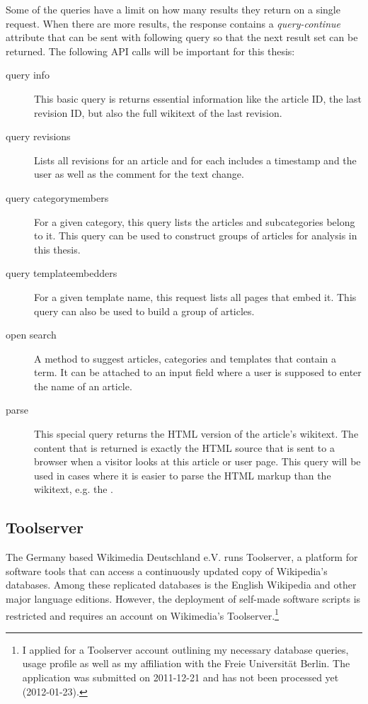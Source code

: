 Some of the queries have a limit on how many results they return on a single request.
When there are more results, the response contains a \emph{query-continue} attribute that can be sent with following query so that the next result set can be returned.
The following API calls will be important for this thesis:

\begin{description}
    \item[query info] This basic query is returns essential information like the article ID, the last revision ID, but also the full wikitext of the last revision.
    \item[query revisions] Lists all revisions for an article and for each includes a timestamp and the user as well as the comment for the text change.
    \item[query categorymembers] For a given category, this query lists the articles and subcategories belong to it.
    This query can be used to construct groups of articles for analysis in this thesis.
    \item[query templateembedders] For a given template name, this request lists all pages that embed it.
    This query can also be used to build a group of articles. 
    \item[open search] A method to suggest articles, categories and templates that contain a term. 
    It can be attached to an input field where a user is supposed to enter the name of an article.
    \item[parse] This special query returns the HTML version of the article's wikitext.
    The content that is returned is exactly the HTML source that is sent to a browser when a visitor looks at this article or user page.
    This query will be used in cases where it is easier to parse the HTML markup than the wikitext, e.g. the .
\end{description}

\subsection{Toolserver}\label{sub:toolserver}

The Germany based Wikimedia Deutschland e.V. runs Toolserver, a platform for software tools that can access a continuously updated copy of Wikipedia's databases. 
Among these replicated databases is the English Wikipedia and other major language editions.
However, the deployment of self-made software scripts is restricted and requires an account on Wikimedia's Toolserver.\footnote{I applied for a Toolserver account outlining my necessary database queries, usage profile as well as my affiliation with the Freie Universit\"at Berlin. The application was submitted on 2011-12-21 and has not been processed yet (2012-01-23).}

